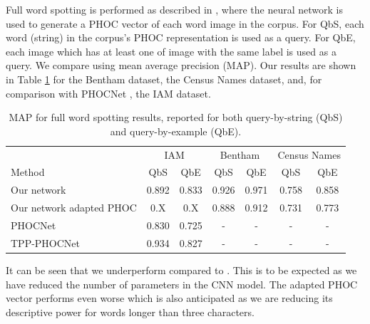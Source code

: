 \documentclass[ms,electronic,twosidetoc,letterpaper,chaptercenter,parttop,lof,lot]{byumsphd}
\begin{document}
Full word spotting is performed as described in \cite{sudholt2016}, where the neural network is used to generate a PHOC vector of each word image in the corpus. For QbS, each word (string) in the corpus's PHOC representation is used as a query. For QbE, each image which has at least one of image with the same label is used as a query. We compare using mean average precision (MAP). Our results are shown in Table \ref{tab:wordspottingresults} for the Bentham dataset, the Census Names dataset, and, for comparison with PHOCNet \cite{sudholt2016,sudholt2017}, the IAM dataset.

\begin{table}
\centering
\begin{tabular}{| l | c  c | c c | c c |}
  \hline
   & \multicolumn{2}{c|}{IAM} & \multicolumn{2}{c|}{Bentham} & \multicolumn{2}{c|}{Census Names}\\
  Method & QbS & QbE & QbS & QbE & QbS & QbE\\
  \hline		
  Our network  &  0.892 & 0.833  &  0.926 & 0.971  &  0.758 & 0.858  \\%
  Our network adapted PHOC  &  0.X & 0.X  &  0.888 & 0.912  &  0.731 & 0.773 \\
  
  PHOCNet\cite{sudholt2016} & 0.830 & 0.725 & - & - & - & - \\
  TPP-PHOCNet\cite{sudholt2017} & 0.934 & 0.827 & - & - & - & - \\
  \hline  
\end{tabular}
\caption{MAP for full word spotting results, reported for both query-by-string (QbS) and query-by-example (QbE).}
\label{tab:wordspottingresults}
\end{table}

It can be seen that we underperform compared to \cite{sudholt2017}. This is to be expected as we have reduced the number of parameters in the  	CNN model. The adapted PHOC vector performs even worse which is also anticipated as we are reducing its descriptive power for words longer than three characters.
\end{document}
